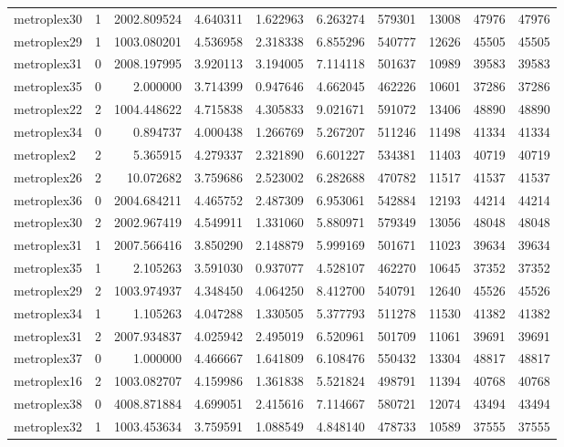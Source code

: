 \begin{longtable}{|l|r|r|r|r|r|r|r|r|r|}
metroplex30 & 1 & 2002.809524 & 4.640311 & 1.622963 & 6.263274 & 579301 & 13008 & 47976 & 47976 \\
metroplex29 & 1 & 1003.080201 & 4.536958 & 2.318338 & 6.855296 & 540777 & 12626 & 45505 & 45505 \\
metroplex31 & 0 & 2008.197995 & 3.920113 & 3.194005 & 7.114118 & 501637 & 10989 & 39583 & 39583 \\
metroplex35 & 0 & 2.000000 & 3.714399 & 0.947646 & 4.662045 & 462226 & 10601 & 37286 & 37286 \\
metroplex22 & 2 & 1004.448622 & 4.715838 & 4.305833 & 9.021671 & 591072 & 13406 & 48890 & 48890 \\
metroplex34 & 0 & 0.894737 & 4.000438 & 1.266769 & 5.267207 & 511246 & 11498 & 41334 & 41334 \\
metroplex2 & 2 & 5.365915 & 4.279337 & 2.321890 & 6.601227 & 534381 & 11403 & 40719 & 40719 \\
metroplex26 & 2 & 10.072682 & 3.759686 & 2.523002 & 6.282688 & 470782 & 11517 & 41537 & 41537 \\
metroplex36 & 0 & 2004.684211 & 4.465752 & 2.487309 & 6.953061 & 542884 & 12193 & 44214 & 44214 \\
metroplex30 & 2 & 2002.967419 & 4.549911 & 1.331060 & 5.880971 & 579349 & 13056 & 48048 & 48048 \\
metroplex31 & 1 & 2007.566416 & 3.850290 & 2.148879 & 5.999169 & 501671 & 11023 & 39634 & 39634 \\
metroplex35 & 1 & 2.105263 & 3.591030 & 0.937077 & 4.528107 & 462270 & 10645 & 37352 & 37352 \\
metroplex29 & 2 & 1003.974937 & 4.348450 & 4.064250 & 8.412700 & 540791 & 12640 & 45526 & 45526 \\
metroplex34 & 1 & 1.105263 & 4.047288 & 1.330505 & 5.377793 & 511278 & 11530 & 41382 & 41382 \\
metroplex31 & 2 & 2007.934837 & 4.025942 & 2.495019 & 6.520961 & 501709 & 11061 & 39691 & 39691 \\
metroplex37 & 0 & 1.000000 & 4.466667 & 1.641809 & 6.108476 & 550432 & 13304 & 48817 & 48817 \\
metroplex16 & 2 & 1003.082707 & 4.159986 & 1.361838 & 5.521824 & 498791 & 11394 & 40768 & 40768 \\
metroplex38 & 0 & 4008.871884 & 4.699051 & 2.415616 & 7.114667 & 580721 & 12074 & 43494 & 43494 \\
metroplex32 & 1 & 1003.453634 & 3.759591 & 1.088549 & 4.848140 & 478733 & 10589 & 37555 & 37555 \\

\end{longtable}
